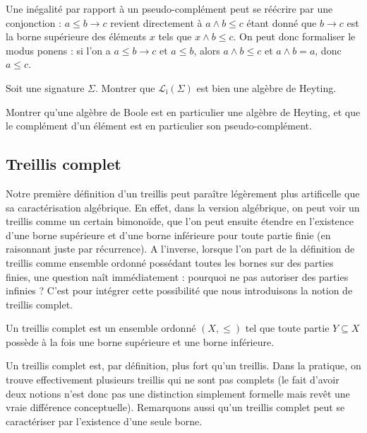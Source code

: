 \begin{remark}
  Une inégalité par rapport à un pseudo-complément peut se réécrire par une
  conjonction : $a\leq b \to c$ revient directement à $a\land b \leq c$ étant
  donné que $b \to c$ est la borne supérieure des éléments $x$ tels que
  $x\land b \leq c$. On peut donc formaliser le modus ponens : si l'on a
  $a\leq b \to c$ et $a\leq b$, alors $a\land b \leq c$ et $a\land b = a$, donc
  $a\leq c$.
\end{remark}

\begin{exercise}
  Soit une signature $\Sigma$. Montrer que $\mathcal L_\mathrm i(\Sigma)$ est
  bien une algèbre de Heyting.
\end{exercise}

\begin{exercise}
  Montrer qu'une algèbre de Boole est en particulier une algèbre de Heyting, et
  que le complément d'un élément est en particulier son pseudo-complément.
\end{exercise}

\subsection{Treillis complet}

Notre première définition d'un treillis peut paraître légèrement plus
artificelle que sa caractérisation algébrique. En effet, dans la version
algébrique, on peut voir un treillis comme un certain bimonoïde, que l'on peut
ensuite étendre en l'existence d'une borne supérieure et d'une borne inférieure
pour toute partie finie (en raisonnant juste par récurrence). A l'inverse,
lorsque l'on part de la définition de treillis comme ensemble ordonné possédant
toutes les bornes sur des parties finies, une question naît immédiatement :
pourquoi ne pas autoriser des parties infinies ? C'est pour intégrer cette
possibilité que nous introduisons la notion de treillis complet.

\begin{definition}
  Un treillis complet est un ensemble ordonné $(X,\leq)$ tel que toute partie
  $Y\subseteq X$ possède à la fois une borne supérieure et une borne inférieure.
\end{definition}

Un treillis complet est, par définition, plus fort qu'un treillis. Dans la
pratique, on trouve effectivement plusieurs treillis qui ne sont pas complets
(le fait d'avoir deux notions n'est donc pas une distinction simplement formelle
mais revêt une vraie différence conceptuelle). Remarquons aussi qu'un treillis
complet peut se caractériser par l'existence d'une seule borne.

